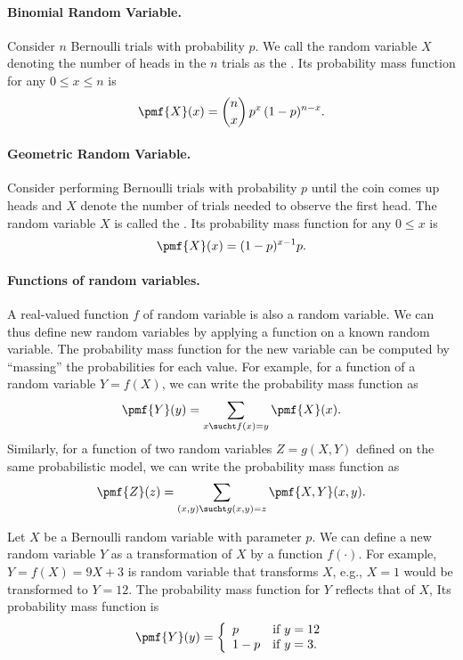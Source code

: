 {\paragraph{Binomial Random Variable.}  

Consider $n$ Bernoulli trials with probability $p$.  We call the
random variable $X$ denoting the number of heads in the $n$ trials as
the .
%
Its probability mass function for any $0 \le x \le n$ is 
%
\[
\pmf{X}(x) = {n \choose x}\,p^x\,(1-p)^{n-x}.
\]


\paragraph{Geometric Random Variable.}  
Consider performing Bernoulli trials with probability $p$ until the
coin comes up heads and  $X$ denote the number of trials needed to
observe the first head. 
%
The random variable $X$ is called the .
%
Its probability mass function for any $0 \le x$ is 
%
\[
\pmf{X}(x) = (1-p)^{x-1} p.
\]

\paragraph{Functions of random variables.}

A real-valued function $f$ of random variable is also a random
variable. 
%
We can thus define new random variables by applying a function on a
known random variable.
%
The probability mass function for the new variable can be computed by
``massing'' the probabilities for each value.
%
For example, for a function of a random variable $Y = f(X)$, we can
write the probability mass function as 
\[
\pmf{Y}(y) = \sum_{x \sucht f(x) = y}{\pmf{X}(x)}.
\]
%
Similarly, for a function of two random variables $Z = g(X,Y)$ defined
on the same probabilistic model, we can write the probability mass
function as
\[
\pmf{Z}(z) = \sum_{(x,y) \sucht g(x,y) = z}{\pmf{X,Y}(x,y)}.
\]

\begin{example}
Let $X$ be a Bernoulli random variable with parameter $p$.  We can
define a new random variable $Y$ as a transformation of $X$ by a
function $f(\cdot)$.  For example, $Y = f(X) = 9X + 3$ is random
variable that transforms $X$, e.g., $X = 1$ would be transformed to $Y
= 12$.
%
The probability mass function for $Y$ reflects that of $X$,
%
Its probability mass function is 
\[
\pmf{Y}(y) = 
\left\{
\begin{array}{ll}
p & \mbox{if}~y = 12
\\
1-p & \mbox{if}~y = 3.
\end{array}
\right.
\]


\end{example}}
